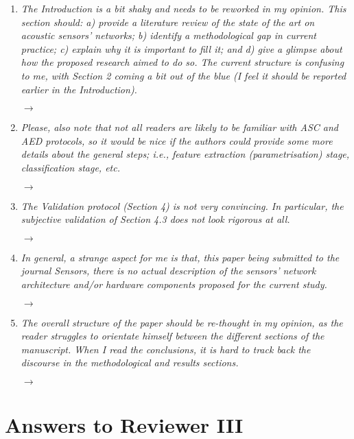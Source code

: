 \documentclass[10pt]{article}
\begin{document}
\begin{enumerate}

\item \emph{The Introduction is a bit shaky and needs to be reworked in my opinion. This section should: a) provide a literature review of the state of the art on acoustic sensors’ networks; b) identify a methodological gap in current practice; c) explain why it is important to fill it; and d) give a glimpse about how the proposed research aimed to do so. The current structure is confusing to me, with Section 2 coming a bit out of the blue (I feel it should be reported earlier in the Introduction).}

$\rightarrow$

\item \emph{Please, also note that not all readers are likely to be familiar with ASC and AED protocols, so it would be nice if the authors could provide some more details about the general steps; i.e., feature extraction (parametrisation) stage, classification stage, etc.}

$\rightarrow$

\item \emph{The Validation protocol (Section 4) is not very convincing. In particular, the subjective validation of Section 4.3 does not look rigorous at all.}

$\rightarrow$

\item \emph{In general, a strange aspect for me is that, this paper being submitted to the journal Sensors, there is no actual description of the sensors’ network architecture and/or hardware components proposed for the current study.}

$\rightarrow$

\item \emph{The overall structure of the paper should be re-thought in my opinion, as the reader struggles to orientate himself between the different sections of the manuscript. When I read the conclusions, it is hard to track back the discourse in the methodological and results sections.}

$\rightarrow$

\end{enumerate}


\section{Answers to Reviewer III}
\end{document}
